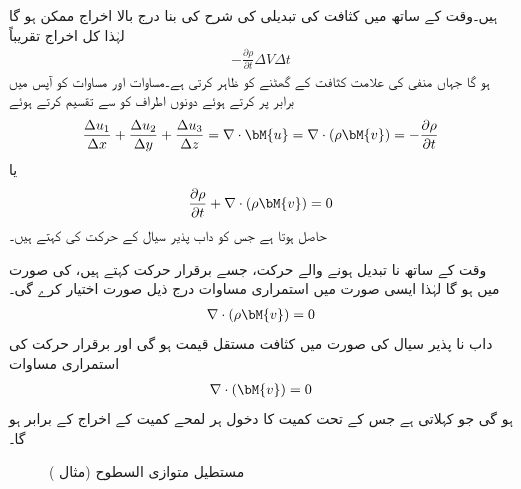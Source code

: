 ہیں۔وقت کے ساتھ  میں  کثافت کی تبدیلی کی شرح کی بنا درج بالا اخراج ممکن ہو گا لہٰذا کل اخراج تقریباً
\begin{align}\label{مساوات_الاحصاء_اخراج_ب}
-\frac{\partial \rho}{\partial t} \Delta V\Delta t
\end{align}  
ہو گا جہاں منفی کی علامت کثافت کے گھٹنے کو ظاہر کرتی ہے۔مساوات  اور مساوات  کو آپس میں برابر پر کرتے ہوئے دونوں اطراف کو  سے تقسیم کرتے ہوئے
\begin{align*}
\frac{\Delta u_1}{\Delta x}+\frac{\Delta u_2}{\Delta y}+\frac{\Delta u_3}{\Delta z}=\nabla \cdot \bM{u}=\nabla \cdot (\rho \bM{v})=-\frac{\partial \rho}{\partial t}
\end{align*}
یا
\begin{align}\label{مساوات_الاحصاء_استمراری}
\frac{\partial \rho}{\partial t}+\nabla \cdot (\rho \bM{v})=0
\end{align}
حاصل ہوتا ہے جس کو داب پذیر سیال کے حرکت کی   کہتے ہیں۔

وقت کے ساتھ نا تبدیل ہونے والے حرکت، جسے برقرار حرکت کہتے ہیں، کی صورت میں  ہو گا لہٰذا ایسی صورت میں  استمراری مساوات  درج ذیل صورت اختیار کرے گی۔
\begin{align}
\nabla \cdot(\rho \bM{v})=0
\end{align}
 داب نا پذیر سیال کی صورت میں کثافت  مستقل قیمت ہو گی اور برقرار حرکت کی استمراری مساوات
\begin{align}\label{مساوات_سمتی_تفرق_پھیلاو_صفر}
\nabla \cdot( \bM{v})=0
\end{align}
ہو گی جو  کہلاتی ہے جس کے تحت کمیت کا دخول ہر لمحے  کمیت کے اخراج کے برابر ہو گا۔
\begin{figure}
\centering
{}
\caption{مستطیل متوازی السطوح (مثال )}
\label{شکل_مثال_الاحصاء_حرکت_سیال}
\end{figure}

